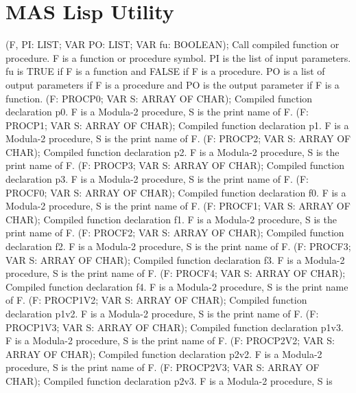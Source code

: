 \section{ MAS Lisp Utility  } 
 (F, PI: LIST; VAR PO: LIST; VAR fu: BOOLEAN); \eproc
\bcom Call compiled function or procedure. F is a function or procedure
symbol. PI is the list of input parameters. fu is TRUE if F is a 
function and FALSE if F is a procedure. PO is a list of output 
parameters if F is a procedure and PO is the output parameter if 
F is a function.  \ecom 
{} (F: PROCP0; VAR S: ARRAY OF CHAR); \eproc
\bcom Compiled function declaration p0. F is a Modula-2 procedure, S is
the print name of F.  \ecom 
{} (F: PROCP1; VAR S: ARRAY OF CHAR); \eproc
\bcom Compiled function declaration p1. F is a Modula-2 procedure, S is
the print name of F.  \ecom 
{} (F: PROCP2; VAR S: ARRAY OF CHAR); \eproc
\bcom Compiled function declaration p2. F is a Modula-2 procedure, S is
the print name of F.  \ecom 
{} (F: PROCP3; VAR S: ARRAY OF CHAR); \eproc
\bcom Compiled function declaration p3. F is a Modula-2 procedure, S is
the print name of F.  \ecom 
{} (F: PROCF0; VAR S: ARRAY OF CHAR); \eproc
\bcom Compiled function declaration f0. F is a Modula-2 procedure, S is
the print name of F.  \ecom 
{} (F: PROCF1; VAR S: ARRAY OF CHAR); \eproc
\bcom Compiled function declaration f1. F is a Modula-2 procedure, S is
the print name of F.  \ecom 
{} (F: PROCF2; VAR S: ARRAY OF CHAR); \eproc
\bcom Compiled function declaration f2. F is a Modula-2 procedure, S is
the print name of F.  \ecom 
{} (F: PROCF3; VAR S: ARRAY OF CHAR); \eproc
\bcom Compiled function declaration f3. F is a Modula-2 procedure, S is
the print name of F.  \ecom 
{} (F: PROCF4; VAR S: ARRAY OF CHAR); \eproc
\bcom Compiled function declaration f4. F is a Modula-2 procedure, S is
the print name of F.  \ecom 
{} (F: PROCP1V2; VAR S: ARRAY OF CHAR); \eproc
\bcom Compiled function declaration p1v2. F is a Modula-2 procedure, S is
the print name of F.  \ecom 
{} (F: PROCP1V3; VAR S: ARRAY OF CHAR); \eproc
\bcom Compiled function declaration p1v3. F is a Modula-2 procedure, S is
the print name of F.  \ecom 
{} (F: PROCP2V2; VAR S: ARRAY OF CHAR); \eproc
\bcom Compiled function declaration p2v2. F is a Modula-2 procedure, S is
the print name of F.  \ecom 
{} (F: PROCP2V3; VAR S: ARRAY OF CHAR); \eproc
\bcom Compiled function declaration p2v3. F is a Modula-2 procedure, S is
